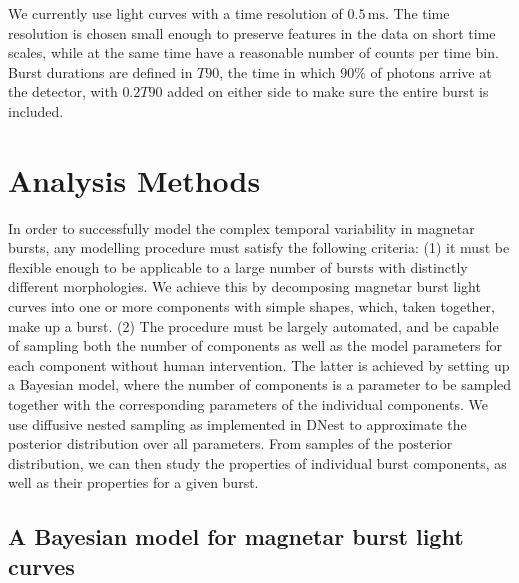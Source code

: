 \documentclass[12pt]{emulateapj}
\newcommand{\project}[1]{\textsl{#1}}
\newcommand{\RXTE}{\project{RXTE}}
\newcommand{\counts}{y}
\begin{document}
We currently use light curves with a time resolution of $0.5\,\mathrm{ms}$. The time resolution is chosen small enough to preserve features
in the data on short time scales, while at the same time have a reasonable number of counts per time bin. 
Burst durations are defined in $T90$, the time in which $90\%$ of photons arrive at the detector, with $0.2T90$ added on either side
to make sure the entire burst is included. 




\section{Analysis Methods}

In order to successfully model the complex temporal variability in magnetar bursts, any modelling procedure must satisfy the following criteria: (1) it must be flexible enough to be applicable to a large number of bursts with distinctly different morphologies. We achieve this by decomposing magnetar burst light curves into one or more components with simple shapes, which, taken together, make up a burst. (2) The procedure must be largely automated, and be capable of sampling both the number of components as well as the model parameters for each component without human intervention. The latter is achieved by setting up a Bayesian model, where the number of components is a parameter to be sampled together with the corresponding parameters of the individual components. We use diffusive nested sampling as implemented in DNest \citep{brewer2011} to approximate the posterior distribution over all parameters. From samples of the posterior distribution,
we can then study the properties of individual burst components, as well as their properties for a given burst.

\subsection{A Bayesian model for magnetar burst light curves}
\label{sec:model}
\end{document}
